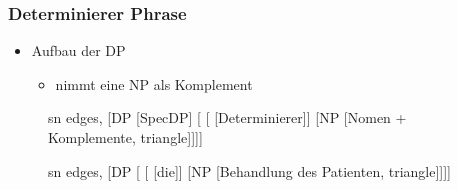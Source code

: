 \begin{frame}
\frametitle{Determinierer Phrase}

	\begin{itemize}
		\item Aufbau der DP
		\begin{itemize}
			\item {} nimmt eine NP als Komplement
		\end{itemize}
	\end{itemize}


\begin{figure}[b]
  	\begin{minipage}[b]{0.45\textwidth}
	\centering
	\footnotesize{
		\begin{forest}
		sn edges,
		[DP [SpecDP]
			[ 	[ [Determinierer]]
						[NP [Nomen + Komplemente, triangle]]]]
		\end{forest}
		}
  	\end{minipage}  
	\begin{minipage}[b]{0.45\textwidth}
	\centering
	\footnotesize{
		\begin{forest}
		sn edges,
		[DP [ 	[ [die]]
						[NP [Behandlung des Patienten, triangle]]]]
		\end{forest}
		}
  	\end{minipage}  
\end{figure}

\end{frame}



